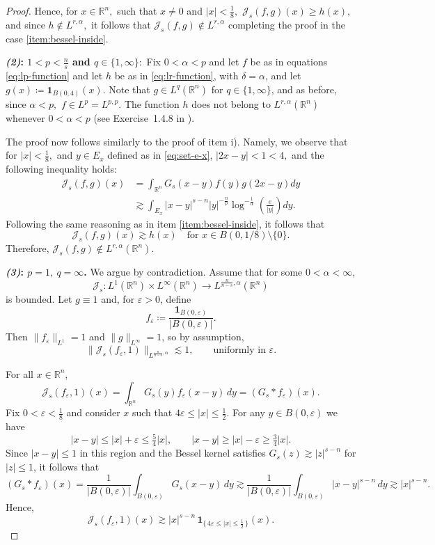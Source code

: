 \documentclass[12pt]{article}
\theoremstyle{definition}
\theoremstyle{remark}
\numberwithin{equation}{section}
\begin{document}
\begin{proof}
Hence,  for $x\in \mathbb{R}^n,$ such that $x\neq 0$ and $|x|<\frac{1}{8},$ $\mathcal{J}_s(f,g)(x)\geq h(x),$ and since $h\notin L^{r,\alpha},$ it follows that $\mathcal{J}_s(f,g)\notin L^{r,\alpha}$ completing the proof in the case \ref{item:bessel-inside}.

\noindent\textbf{\textit{(2)}: $1<p<\frac{n}{s}$ and $q\in\{1,\infty\}:$}  Fix $0<\alpha<p$ and let $f$ be as in equations \eqref{eq:lp-function} and let $h$ be as in \eqref{eq:lr-function}, with $\delta=\alpha$, and let $g(x)\coloneq\mathbf 1_{B(0,4)}(x).$ Note that $g\in L^q(\mathbb R^n)$ for $q\in\{1,\infty\}$, and as before, since $\alpha<p,$  $f\in L^p= L^{p,p}.$ The function $h$ does not belong to $L^{r,\alpha}(\mathbb R^n)$ whenever
$0<\alpha<p$ (see Exercise~1.4.8 in \cite{Gra}).

The proof now follows similarly to the proof of item i). Namely, we observe that for $|x|<\frac{1}{8},$ and $y\in E_x$ defined as in \eqref{eq:set-e-x}, $|2x-y|<1<4,$
and the following inequality holds:
\begin{align*}
\mathcal{J}_s(f,g)(x)&=\int_{\mathbb{R}^n}G_s(x-y)f(y)g(2x-y)dy \\
&\gtrsim  \int_{E_x}|x-y|^{s-n}|y|^{-\frac{n}{p}}\log^{-\frac{1}{\alpha}}\left(\frac{e}{|y|}\right)dy.\end{align*}
Following the same reasoning as in item \ref{item:bessel-inside}, it follows that 
\[
\mathcal{J}_s(f,g)(x) \gtrsim h(x) \quad \text{for } x\in B(0,1/8)\setminus\{0\}.
\]
Therefore, $\mathcal{J}_{s}(f,g)\notin L^{r,\alpha}(\mathbb{R}^n).$



\noindent\textbf{\textit{(3)}: $p=1,\ q=\infty$.}
We argue by contradiction. Assume that for some $0<\alpha<\infty$,
\[
\mathcal J_s:
L^1(\mathbb R^n)\times L^\infty(\mathbb R^n)
\longrightarrow
L^{\frac{n}{n-s},\alpha}(\mathbb R^n)
\]
is bounded. Let $g\equiv 1$ and, for $\varepsilon>0$, define
\[
f_\varepsilon \coloneq \frac{\mathbf 1_{B(0,\varepsilon)}}{|B(0,\varepsilon)|}.
\]
Then $\|f_\varepsilon\|_{L^1}=1$ and $\|g\|_{L^\infty}=1$, so by assumption,
\begin{equation}\label{eq:bessel-bound-3}
\|\mathcal J_s(f_\varepsilon,1)\|_{L^{\frac{n}{n-s},\alpha}}
\lesssim 1,
\qquad\text{uniformly in }\varepsilon.
\end{equation}

For all $x\in\mathbb R^n$,
\[
\mathcal J_s(f_\varepsilon,1)(x)
=\int_{\mathbb R^n} G_s(y) f_\varepsilon(x-y)\,dy
=(G_s*f_\varepsilon)(x).
\]
Fix $0<\varepsilon<\tfrac18$ and consider $x$ such that
$4\varepsilon\le |x|\le \tfrac12$.
For any $y\in B(0,\varepsilon)$ we have
\[
|x-y|\le |x|+\varepsilon \le \tfrac54 |x|,
\qquad
|x-y|\ge |x|-\varepsilon \ge \tfrac34 |x|.
\]
Since $|x-y|\le 1$ in this region and the Bessel kernel satisfies
$G_s(z)\gtrsim |z|^{s-n}$ for $|z|\le 1$, it follows that
\[
(G_s*f_\varepsilon)(x)
=\frac1{|B(0,\varepsilon)|}\int_{B(0,\varepsilon)} G_s(x-y)\,dy
\gtrsim
\frac1{|B(0,\varepsilon)|}\int_{B(0,\varepsilon)} |x-y|^{s-n}\,dy
\gtrsim |x|^{s-n}.
\]
Hence,
\[
\mathcal J_s(f_\varepsilon,1)(x)
\gtrsim |x|^{s-n}\,
\mathbf 1_{\{\,4\varepsilon\le |x|\le \frac12\,\}}(x).
\]


\end{proof}
\end{document}
